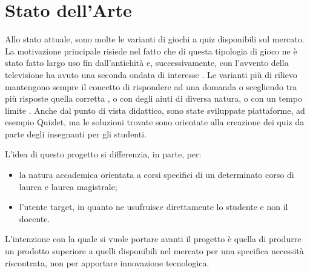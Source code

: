 

\chapter{Stato dell'Arte}

 Allo stato attuale, sono molte le varianti di giochi a quiz disponibili sul mercato. La motivazione principale risiede nel fatto che di questa tipologia di gioco ne è stato fatto largo uso fin dall'antichità \cite{quizgame} e, successivamente, con l'avvento della televisione ha avuto una seconda ondata di interesse \cite{gameshow}. Le varianti più di rilievo mantengono sempre il concetto di rispondere ad una domanda o scegliendo tra più risposte quella corretta \cite{whowantstobeamillionaire}, o con degli aiuti di diversa natura, o con un tempo limite \cite{jeopardy}. 
 Anche dal punto di vista didattico, sono state sviluppate piattaforme, ad esempio Quizlet\cite{quizlet}, ma le soluzioni trovate sono orientate alla creazione dei quiz da parte degli insegnanti per gli studenti.
 
 L'idea di questo progetto si differenzia, in parte, per: 
\begin{itemize}
    \item la natura accademica orientata a corsi specifici di un determinato corso di laurea e laurea magistrale;
    \item l'utente target, in quanto ne usufruisce direttamente lo studente e non il docente.
\end{itemize}
 
L'intenzione con la quale si vuole portare avanti il progetto è quella di produrre un prodotto superiore a quelli disponibili nel mercato per una specifica necessità riscontrata, non per apportare innovazione tecnologica.